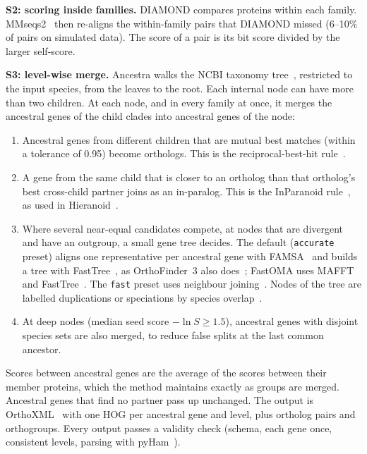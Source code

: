 \documentclass[10pt,letterpaper]{article}
\begin{document}
\textbf{S2: scoring inside families.} DIAMOND compares proteins within each family. MMseqs2~\cite{steinegger2017mmseqs2} then re-aligns the within-family pairs that DIAMOND missed (6--10\% of pairs on simulated data). The score of a pair is its bit score divided by the larger self-score.

\textbf{S3: level-wise merge.} Ancestra walks the NCBI taxonomy tree~\cite{schoch2020ncbitaxonomy}, restricted to the input species, from the leaves to the root. Each internal node can have more than two children. At each node, and in every family at once, it merges the ancestral genes of the child clades into ancestral genes of the node:
\begin{enumerate}
\item Ancestral genes from different children that are mutual best matches (within a tolerance of 0.95) become orthologs. This is the reciprocal-best-hit rule~\cite{remm2001inparanoid}.
\item A gene from the same child that is closer to an ortholog than that ortholog's best cross-child partner joins as an in-paralog. This is the InParanoid rule~\cite{remm2001inparanoid}, as used in Hieranoid~\cite{schreiber2013hieranoid}.
\item Where several near-equal candidates compete, at nodes that are divergent and have an outgroup, a small gene tree decides. The default (\texttt{accurate} preset) aligns one representative per ancestral gene with FAMSA~\cite{deorowicz2016famsa} and builds a tree with FastTree~\cite{price2010fasttree2}, as OrthoFinder~3 also does~\cite{emms2026orthofinder3}; FastOMA uses MAFFT and FastTree~\cite{majidian2025fastoma}. The \texttt{fast} preset uses neighbour joining~\cite{saitou1987nj}. Nodes of the tree are labelled duplications or speciations by species overlap~\cite{huertacepas2007overlap}.
\item At deep nodes (median seed score $-\ln S \geq 1.5$), ancestral genes with disjoint species sets are also merged, to reduce false splits at the last common ancestor.
\end{enumerate}
Scores between ancestral genes are the average of the scores between their member proteins, which the method maintains exactly as groups are merged. Ancestral genes that find no partner pass up unchanged. The output is OrthoXML~\cite{schmitt2011orthoxml} with one HOG per ancestral gene and level, plus ortholog pairs and orthogroups. Every output passes a validity check (schema, each gene once, consistent levels, parsing with pyHam~\cite{train2019pyham}).
\end{document}
